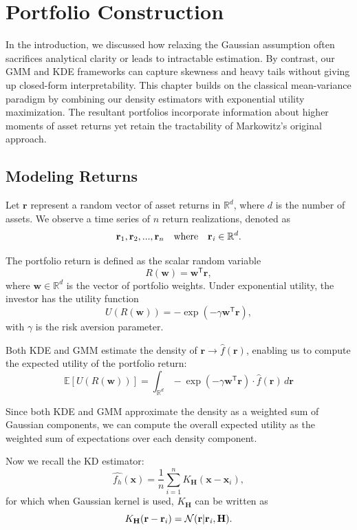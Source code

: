 
\chapter{Portfolio Construction}
\label{chap:portfolio}

In the introduction, we discussed how relaxing the Gaussian assumption often sacrifices analytical clarity or leads to intractable estimation. By contrast, our GMM and KDE frameworks can capture skewness and heavy tails without giving up closed-form interpretability. This chapter builds on the classical mean-variance paradigm by combining our density estimators with exponential utility maximization. The resultant portfolios incorporate information about higher moments of asset returns yet retain the tractability of Markowitz's original approach.

\section{Modeling Returns}
Let $\mathbf{r}$ represent a random vector of asset returns in $\mathbb{R}^{d}$, where $d$ is the number of assets. We observe a time series of $n$ return realizations, denoted as
$$\mathbf{r}_{1},\mathbf{r}_2,...,\mathbf{r}_{n}\quad\text{where}\quad \mathbf{r}_{\it{i}}\in\mathbb{R}^{d}.$$

The portfolio return is defined as the scalar random variable
$$R(\mathbf{w})=\mathbf{w}^{\mathsf{T}}\mathbf{r},$$
where $\mathbf{w}\in\mathbb{R}^{d}$ is the vector of portfolio weights. Under exponential utility, the investor has the utility function
$$U(R(\mathbf{w}))=-\exp(-\gamma\mathbf{w}^{\mathsf{T}}\mathbf{r}),$$
with $\gamma$ is the risk aversion parameter.

Both KDE and GMM estimate the density of $\mathbf{r}\rightarrow\hat{f}(\mathbf{r})$, enabling us to compute the expected utility of the portfolio return:
$$\mathbb{E}[U(R(\mathbf{w}))]=\int_{\mathbb{R}^{d}}-\exp(-\gamma\mathbf{w}^{\mathsf{T}}\mathbf{r})\cdot\hat{f}(\mathbf{r})\,d\mathbf{r}$$

Since both KDE and GMM approximate the density as a weighted sum of Gaussian components, 
we can compute the overall expected utility as the weighted sum of expectations over each density component.

Now we recall the KD estimator: 
$$\displaystyle\hat{f_h}(\mathbf{x})=\frac{1}{n}\sum_{i=1}^{n}K_\mathbf{H}(\mathbf{x}-\mathbf{x}_i),$$
for which when Gaussian kernel is used, $K_\mathbf{H}$ can be written as
$$K_\mathbf{H}(\mathbf{r}-\mathbf{r}_i)=\mathcal{N}(\mathbf{r|r_{\it{i}},H}).$$

